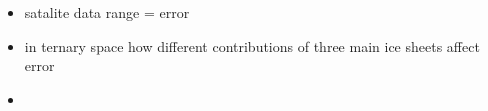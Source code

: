 \begin{itemize}
    \item satalite data range = error
    \item in ternary space how different contributions of three main ice sheets affect error
    \item 
\end{itemize}